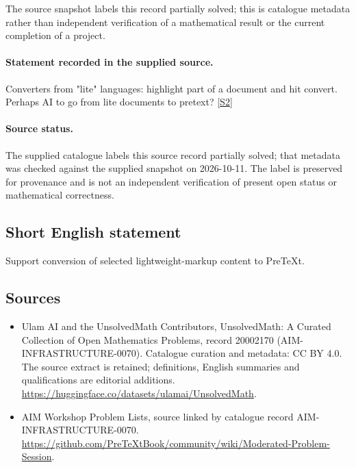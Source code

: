 \documentclass[11pt]{article}
\begin{document}
The source snapshot labels this record partially solved; this is catalogue metadata rather than independent verification of a mathematical result or the current completion of a project.
\paragraph{Statement recorded in the supplied source.}
Converters from "lite" languages: highlight part of a document and hit convert. Perhaps AI to go from lite documents to pretext? \href{https://github.com/PreTeXtBook/community/wiki/Moderated-Problem-Session}{[S2]}
\paragraph{Source status.}
The supplied catalogue labels this source record partially solved; that metadata was checked against the supplied snapshot on 2026-10-11. The label is preserved for provenance and is not an independent verification of present open status or mathematical correctness.
\subsection{Short English statement}
Support conversion of selected lightweight-markup content to PreTeXt.
\subsection{Sources}
\begin{itemize}
\item[S1] Ulam AI and the UnsolvedMath Contributors, UnsolvedMath: A Curated Collection of Open Mathematics Problems, record 20002170 (AIM-INFRASTRUCTURE-0070). Catalogue curation and metadata: CC BY 4.0. The source extract is retained; definitions, English summaries and qualifications are editorial additions.
\url{https://huggingface.co/datasets/ulamai/UnsolvedMath}.
\item[S2] AIM Workshop Problem Lists, source linked by catalogue record AIM-INFRASTRUCTURE-0070.
\url{https://github.com/PreTeXtBook/community/wiki/Moderated-Problem-Session}.
\end{itemize}
\end{document}
